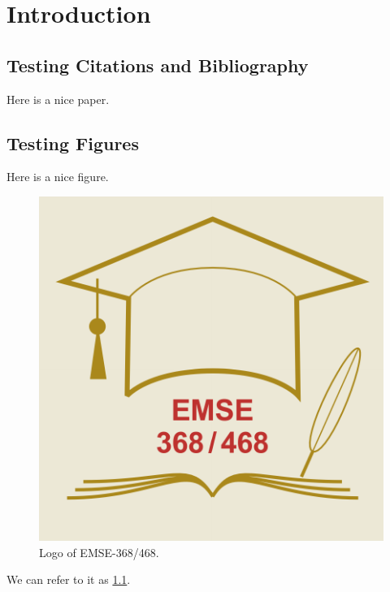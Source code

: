 \chapter{Introduction}

\section{Testing Citations and Bibliography}
\label{sec:testbib}

Here is a nice paper.\cite{ernst-2017-142} 


\section{Testing Figures}
\label{sec:testfig}

Here is a nice figure.

\begin{figure}[t]
  \centering
  \includegraphics[width=0.4\hsize]{../FIG/Logo-368-468.pdf}
  \caption{Logo of EMSE-368/468.}
  \label{fig:logo}
\end{figure}

We can refer to it as \ref{fig:logo}.


% 				
% 



